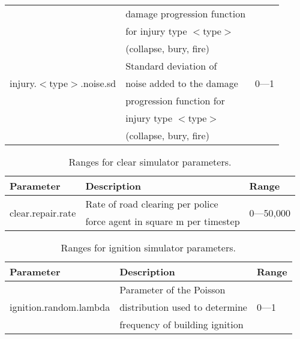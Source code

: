 \documentclass{article}
\begin{document}
\begin{table}[htb]
\begin{tabular}{lll}
                                                            & damage progression
  function                              & \\
                                                            & for injury type
  $<$type$>$                            & \\
                                                            & (collapse, bury,
  fire)                                 & \\
  \hline
  \multirow{3}{*}{injury.$<$type$>$.noise.sd}               & Standard deviation
  of                                    & \multirow{3}{*}{0---1}\\
                                                            & noise added to the
  damage                                & \\
                                                            & progression
  function for                          & \\
                                                            & injury type
  $<$type$>$                            & \\
                                                            & (collapse, bury,
  fire)                                 & \\
  \hline
\end{tabular}
\end{table}

\begin{table}[htb]
\caption{Ranges for clear simulator parameters.}
\label{tab:14}
\centering
\begin{tabular}{lll}
  \hline
  \textbf{Parameter}                  & \textbf{Description}                  & 
  \textbf{Range}\\
  \hline
  \multirow{2}{*}{clear.repair.rate}  & Rate of road clearing per police      & 
  \multirow{2}{*}{0---50,000}\\
                                      & force agent in square m per timestep  &
  \\
  \hline
\end{tabular}
\end{table}

\begin{table}[htb]
\caption{Ranges for ignition simulator parameters.}
\label{tab:15}
\centering
\begin{tabular}{lll}
  \hline
  \textbf{Parameter}                      & \textbf{Description}            & 
  \textbf{Range}\\
  \hline
  \multirow{3}{*}{ignition.random.lambda} & Parameter of the Poisson        & 
  \multirow{3}{*}{0---1}\\
                                          & distribution used to determine  & \\
                                          & frequency of building ignition  & \\
  \hline
\end{tabular}
\end{table}
\end{document}
